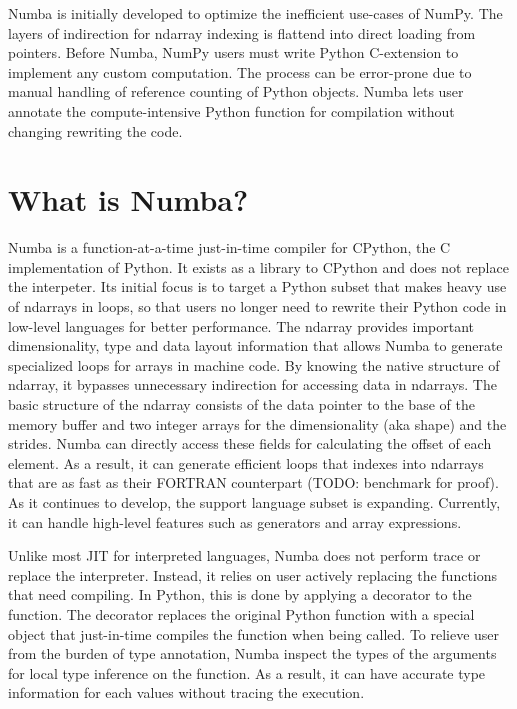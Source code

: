 \documentclass{acm_proc_article-sp}
\begin{document}
Numba is initially developed to optimize the inefficient use-cases of NumPy.
The layers of indirection for ndarray indexing is flattend into direct loading
from pointers.  Before Numba, NumPy users must write Python C-extension to
implement any custom computation.  The process can be error-prone due to manual
handling of reference counting of Python objects. Numba lets user annotate
the compute-intensive Python function for compilation without changing rewriting
the code.

\section{What is Numba?}

Numba is a function-at-a-time just-in-time compiler for CPython,
the C implementation of Python.
It exists as a library to CPython and does not replace the interpeter.
Its initial focus is to target a Python subset that makes heavy use of
ndarrays in loops, so that users no longer need to rewrite their Python code in
low-level languages for better performance.
The ndarray provides important dimensionality, type and data layout information
that allows Numba to generate specialized  loops for arrays in machine code.
By knowing the native structure of ndarray,
it bypasses unnecessary indirection for accessing data in ndarrays.
The basic structure of the ndarray consists of the data pointer to the base of
the memory buffer and two integer arrays for the dimensionality (aka shape) and
the strides. Numba can directly access these fields for calculating the offset
of each element.  As a result, it can generate efficient loops that indexes
into ndarrays that are as fast as their FORTRAN counterpart
(TODO: benchmark for proof). As it continues to develop, the support language
subset is expanding. Currently, it can handle high-level features such as
generators and array expressions.

Unlike most JIT for interpreted languages, Numba does not perform trace or
replace the interpreter.
Instead, it relies on user actively replacing the functions that need compiling.
In Python, this is done by applying a decorator to the function.
The decorator replaces the original Python function with a special object
that just-in-time compiles the function when being called.
To relieve user from the burden of type annotation, Numba inspect the types
of the arguments for local type inference on the function.
As a result, it can have accurate type information for each values without
tracing the execution.
\end{document}

